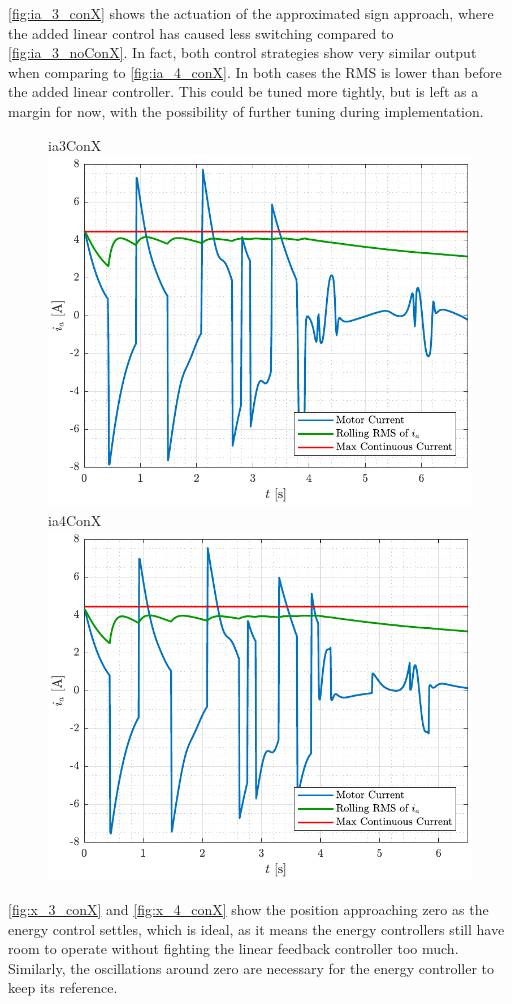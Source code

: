 %
\autoref{fig:ia_3_conX} shows the actuation of the approximated sign approach, where the added linear control has caused less switching compared to \autoref{fig:ia_3_noConX}. In fact, both control strategies show very similar output when comparing to \autoref{fig:ia_4_conX}. In both cases the RMS is lower than before the added linear controller. This could be tuned more tightly, but is left as a margin for now, with the possibility of further tuning during implementation.
%
\begin{figure}[H]
  \hspace{-10pt}
  \captionbox
  {
    ia3ConX
    \label{fig:ia_3_conX}
  }
  {
    \hspace{-1cm}
    \includegraphics[width=.46\textwidth]{figures/ia_3_conX}
  }
  \hspace{20pt}
  \captionbox 
  {
    ia4ConX
    \label{fig:ia_4_conX}
  }
  {
    \hspace{-1cm}
    \includegraphics[width=.46\textwidth]{figures/ia_4_conX}
  }  
\end{figure}
%
\autoref{fig:x_3_conX} and \ref{fig:x_4_conX} show the position approaching zero as the energy control settles, which is ideal, as it means the energy controllers still have room to operate without fighting the linear feedback controller too much. Similarly, the oscillations around zero are necessary for the energy controller to keep its reference.
%
